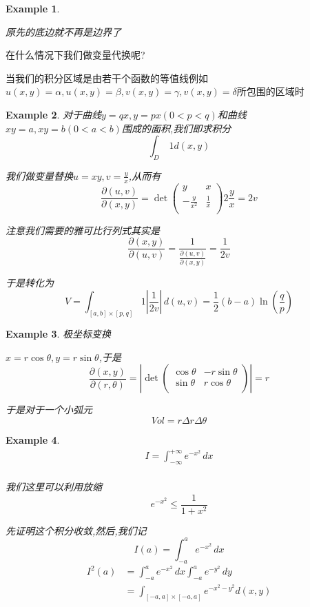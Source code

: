 \documentclass[11pt,hyperref,a4paper,UTF8]{ctexart}
\newtheorem{example}{Example}[subsection]
\newcommand{\parameter}[1]{\left(#1\right)}
\newcommand{\abs}[1]{\left|#1\right|}
\begin{document}
\begin{CJK}{UTF8}{gkai}
\begin{example}
\begin{center}
  \end{center}

  原先的底边就不再是边界了
\end{example}

在什么情况下我们做变量代换呢?

当我们的积分区域是由若干个函数的等值线例如$u(x,y) = \alpha,u(x,y) = \beta, v(x,y) = \gamma,v(x,y) = \delta$所包围的区域时

\begin{example}
  对于曲线$y = qx,y = px(0 < p < q)$和曲线$xy = a,xy = b(0 < a < b)$围成的面积,我们即求积分
  \[\int_{D} ~1 d(x,y)\]

  我们做变量替换$u = xy,v = \frac{y}{x}$,从而有
  \[\frac{\partial(u,v)}{\partial(x,y)} = \det \begin{pmatrix}
    y & x\\
    -\frac{y}{x^2}&\frac{1}{x}\\
  \end{pmatrix} 2\frac{y}{x} = 2v\]

  注意我们需要的雅可比行列式其实是
  \[\frac{\partial(x,y)}{\partial(u,v)} = \frac{1}{\frac{\partial(u,v)}{\partial(x,y)}} = \frac{1}{2v}\]

  于是转化为
  \[V = \int_{[a,b]\times[p,q]} 1 \abs{\frac{1}{2v}}\, d(u,v) = \frac{1}{2 }(b - a) \ln\parameter{\frac{q}{p}}\]
\end{example}

\begin{example}
  极坐标变换

  $x = r\cos \theta,y = r \sin \theta$,于是
  \[\frac{\partial(x,y)}{\partial(r,\theta)} = \abs{\det\begin{pmatrix}
    \cos\theta & - r \sin \theta\\
    \sin \theta & r \cos \theta\\
  \end{pmatrix}} = r\]

  于是对于一个小弧元
  \[Vol = r \Delta r \Delta\theta\]
\end{example}

\begin{example}
  \[\begin{aligned}
    I = \int_{-\infty}^{+\infty} e^{-x^2}\, dx\\
  \end{aligned}\]

  我们这里可以利用放缩
  \[e^{-x^2} \leq \frac{1}{1 + x^2}\]

  先证明这个积分收敛,然后,我们记
  \[I(a) = \int_{-a}^{a} e^{-x^2}\, dx\]
  \[\begin{aligned}
    I^2(a) &= \int_{-a}^{a} e^{-x^2}\, dx\int_{-a}^{a} e^{-y^2}\, dy\\
    &= \int_{[-a,a]\times[-a,a]} e^{-x^2 - y^2} d(x,y)\\
  \end{aligned}\]


\end{example}
\end{CJK}
\end{document}
